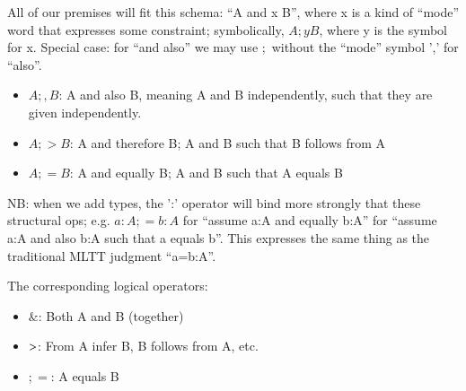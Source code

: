 All of our premises will fit this schema: ``A and x B'', where x is a
kind of ``mode'' word that expresses some constraint; symbolically,
\(A ;y B\), where y is the symbol for x. Special case: for ``and
also'' we may use \(;\) without the ``mode'' symbol ',' for ``also''.

\begin{itemize}
\item \(A ;, B\): A and also B, meaning A and B independently, such that they are given independently.
\item \(A ;> B\): A and therefore B; A and B such that B follows from A
\item \(A ;= B\): A and equally B; A and B such that A equals B
\end{itemize}

NB: when we add types, the ':' operator will bind more strongly that
these structural ops; e.g. \(a:A ;= b:A\) for ``assume a:A and equally
b:A'' for ``assume a:A and also b:A such that a equals b''. This
expresses the same thing as the traditional MLTT judgment ``a=b:A''.

The corresponding logical operators:

\begin{itemize}
\item \(\&\): Both A and B (together)
\item \(\->\): From A infer B, B follows from A, etc.
\item \(;=\): A equals B
\end{itemize}
